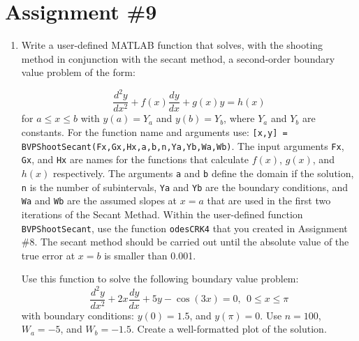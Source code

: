 \chapter{Assignment \#9}

\label{ch:ass9n}

\begin{fullwidth}

\begin{enumerate}
\item Write a user-defined MATLAB function that solves, with the shooting method in conjunction with the secant method, a second-order boundary value problem of the form:

\begin{equation*}
\frac{d^2y}{dx^2}+f(x)\frac{dy}{dx} + g(x)y = h(x)
\end{equation*}
for $a \le x \le b$ with $y(a)=Y_a$ and $y(b)=Y_b$, where $Y_a$ and $Y_b$ are constants.  For the function name and arguments use: \lstinline[style=myMatlab]{[x,y] = BVPShootSecant(Fx,Gx,Hx,a,b,n,Ya,Yb,Wa,Wb)}.  The input arguments \lstinline[style=myMatlab]{Fx}, \lstinline[style=myMatlab]{Gx}, and \lstinline[style=myMatlab]{Hx} are names for the functions that calculate $f(x)$, $g(x)$, and $h(x)$ respectively.  The arguments \lstinline[style=myMatlab]{a} and \lstinline[style=myMatlab]{b} define the domain if the solution, \lstinline[style=myMatlab]{n} is the number of subintervals, \lstinline[style=myMatlab]{Ya} and \lstinline[style=myMatlab]{Yb} are the boundary conditions, and \lstinline[style=myMatlab]{Wa} and \lstinline[style=myMatlab]{Wb} are the assumed slopes at $x=a$ that are used in the first two iterations of the Secant Methad.  Within the user-defined function \lstinline[style=myMatlab]{BVPShootSecant}, use the function \lstinline[style=myMatlab]{odesCRK4} that you created in Assignment \#8.  The secant method should be carried out until the absolute value of the true error at $x=b$ is smaller than 0.001.

\vspace{0.5cm}

\noindent Use this function to solve the following boundary value problem:
\begin{equation*}
\frac{d^2y}{dx^2}+2x\frac{dy}{dx}+5y-\cos{(3x)}=0, \ \ 0 \le x \le \pi
\end{equation*}
with boundary conditions: $y(0)=1.5$, and $y(\pi)=0$.  Use $n=100$, $W_a=-5$, and $W_b = -1.5$.  Create a well-formatted plot of the solution.


\pagebreak


\end{enumerate}
\end{fullwidth}
